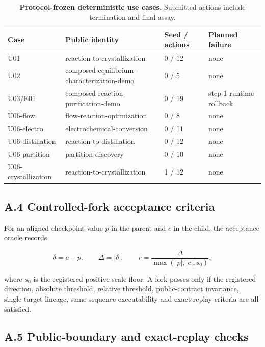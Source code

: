 \documentclass[10pt,twocolumn]{article}
\begin{document}
\begin{table}[H]
\centering
\fontsize{6.7}{7.5}\selectfont
\renewcommand{\arraystretch}{0.88}
\caption{\textbf{Protocol-frozen deterministic use cases.} Submitted actions include termination and final assay.}
\label{tab:deterministic-protocol}
\begin{tabularx}{\columnwidth}{@{}L{0.20\columnwidth}YL{0.12\columnwidth}L{0.17\columnwidth}@{}}
\toprule
Case & Public identity & Seed / actions & Planned failure \\
\midrule
U01 & reaction-to-crystallization & 0 / 12 & none \\
U02 & composed-equilibrium-characterization-demo & 0 / 5 & none \\
U03/E01 & composed-reaction-purification-demo & 0 / 19 & step-1 runtime rollback \\
U06-flow & flow-reaction-optimization & 0 / 8 & none \\
U06-electro & electrochemical-conversion & 0 / 11 & none \\
U06-distillation & reaction-to-distillation & 0 / 12 & none \\
U06-partition & partition-discovery & 0 / 10 & none \\
U06-crystallization & reaction-to-crystallization & 1 / 12 & none \\
\bottomrule
\end{tabularx}
\end{table}

\subsection{A.4 Controlled-fork acceptance
criteria}\label{a.4-controlled-fork-acceptance-criteria}

For an aligned checkpoint value \(p\) in the parent and \(c\) in the
child, the acceptance oracle records

\[
\delta=c-p,\qquad \Delta=|\delta|,\qquad
r=\frac{\Delta}{\max(|p|,|c|,s_0)},
\]

where \(s_0\) is the registered positive scale floor. A fork passes only
if the registered direction, absolute threshold, relative threshold,
public-contract invariance, single-target lineage, same-sequence
executability and exact-replay criteria are all satisfied.

\subsection{A.5 Public-boundary and exact-replay
checks}\label{a.5-public-boundary-and-exact-replay-checks}
\end{document}

